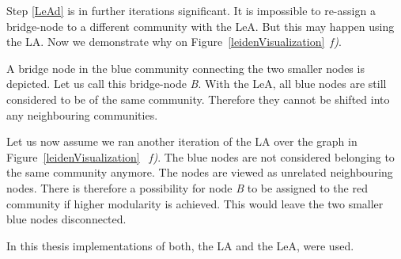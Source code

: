 Step \ref{LeAd} is in further iterations significant.  It is impossible to re-assign a bridge-node to a different community with the LeA. But this may happen using the LA. Now we demonstrate why on Figure~\ref{leidenVisualization}~\textit{f)}. 

A bridge node in the blue community connecting the two smaller nodes is depicted. Let us call this bridge-node \textit{B}. With the LeA, all blue nodes are still considered to be of the same community. Therefore they cannot be shifted into any neighbouring communities. 

Let us now assume we ran another iteration of the LA over the graph in Figure~\ref{leidenVisualization}~ \textit{f)}. The blue nodes are not considered belonging to the same community anymore. The nodes are viewed as unrelated neighbouring nodes. There is therefore a possibility for node \textit{B} to be assigned to the red community if higher modularity is achieved. This would leave the two smaller blue nodes disconnected. 

In this thesis implementations of both, the LA and the LeA, were used.